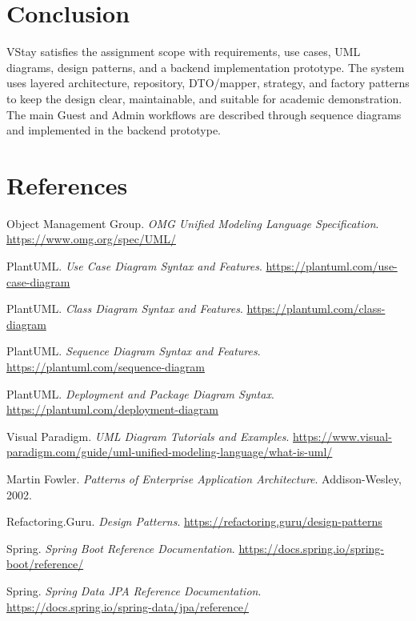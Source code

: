 \documentclass[12pt,a4paper]{article}
\begin{document}
\section{Conclusion}

VStay satisfies the assignment scope with requirements, use cases, UML diagrams, design patterns, and a backend implementation prototype. The system uses layered architecture, repository, DTO/mapper, strategy, and factory patterns to keep the design clear, maintainable, and suitable for academic demonstration. The main Guest and Admin workflows are described through sequence diagrams and implemented in the backend prototype.

\section{References}

\begin{enumerate}[label={[\arabic*]},noitemsep]
  \item Object Management Group. \textit{OMG Unified Modeling Language Specification}. \url{https://www.omg.org/spec/UML/}
  \item PlantUML. \textit{Use Case Diagram Syntax and Features}. \url{https://plantuml.com/use-case-diagram}
  \item PlantUML. \textit{Class Diagram Syntax and Features}. \url{https://plantuml.com/class-diagram}
  \item PlantUML. \textit{Sequence Diagram Syntax and Features}. \url{https://plantuml.com/sequence-diagram}
  \item PlantUML. \textit{Deployment and Package Diagram Syntax}. \url{https://plantuml.com/deployment-diagram}
  \item Visual Paradigm. \textit{UML Diagram Tutorials and Examples}. \url{https://www.visual-paradigm.com/guide/uml-unified-modeling-language/what-is-uml/}
  \item Martin Fowler. \textit{Patterns of Enterprise Application Architecture}. Addison-Wesley, 2002.
  \item Refactoring.Guru. \textit{Design Patterns}. \url{https://refactoring.guru/design-patterns}
  \item Spring. \textit{Spring Boot Reference Documentation}. \url{https://docs.spring.io/spring-boot/reference/}
  \item Spring. \textit{Spring Data JPA Reference Documentation}. \url{https://docs.spring.io/spring-data/jpa/reference/}
\end{enumerate}
\end{document}
